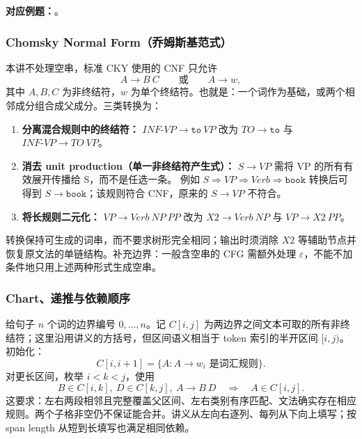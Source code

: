 \textbf{对应例题：}。

\nopagebreak[4]

\subsubsection{Chomsky Normal Form（乔姆斯基范式）}

本讲不处理空串，标准 CKY 使用的 CNF 只允许
\[
  \boxed{A\rightarrow B\ C}\qquad\text{或}\qquad\boxed{A\rightarrow w},
\]
其中 $A,B,C$ 为非终结符，$w$ 为单个终结符。也就是：一个词作为基础，或两个相邻成分组合成父成分。三类转换为：

\begin{enumerate}
  \item \textbf{分离混合规则中的终结符：}
  $INF\text{-}VP\rightarrow\texttt{to}\ VP$ 改为
  $TO\rightarrow\texttt{to}$ 与 $INF\text{-}VP\rightarrow TO\ VP$。
  \item \textbf{消去 unit production（单一非终结符产生式）：}
  $S\rightarrow VP$ 需将 VP 的所有有效展开传播给 S，而不是任选一条。
  例如 $S\Rightarrow VP\Rightarrow Verb\Rightarrow\texttt{book}$ 转换后可得到
  $S\rightarrow\texttt{book}$；该规则符合 CNF，原来的 $S\rightarrow VP$ 不符合。
  \item \textbf{将长规则二元化：}
  $VP\rightarrow Verb\ NP\ PP$ 改为
  $X2\rightarrow Verb\ NP$ 与 $VP\rightarrow X2\ PP$。
\end{enumerate}

转换保持可生成的词串，而不要求树形完全相同；输出时须消除 $X2$ 等辅助节点并恢复原文法的单链结构。补充边界：一般含空串的 CFG 需额外处理 $\varepsilon$，不能不加条件地只用上述两种形式生成空串。

\subsubsection{Chart、递推与依赖顺序}

给句子 $n$ 个词的边界编号 $0,\ldots,n$。记 $C[i,j]$ 为两边界之间文本可取的所有非终结符；这里沿用讲义的方括号，但区间语义相当于 token 索引的半开区间 $[i,j)$。初始化：
\[
  C[i,i+1]=\{A:A\rightarrow w_i\text{ 是词汇规则}\}.
\]
对更长区间，枚举 $i<k<j$，使用
\[
  \boxed{
  B\in C[i,k],\ D\in C[k,j],\ A\rightarrow B\ D
  \quad\Longrightarrow\quad A\in C[i,j].}
\]
这要求：左右两段相邻且完整覆盖父区间、左右类别有序匹配、文法确实存在相应规则。两个子格非空仍不保证能合并。讲义从左向右逐列、每列从下向上填写；按 span length 从短到长填写也满足相同依赖。

